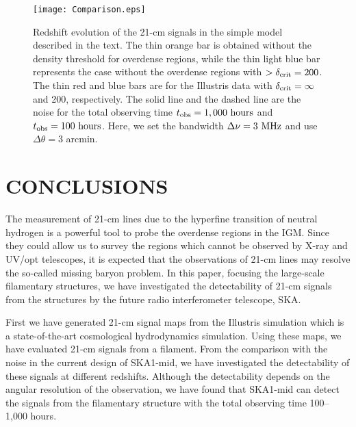 \documentclass[a4paper,fleqn,usenatbib,useAMS]{mnras}
\begin{document}
\begin{figure}
 \texttt{[image: Comparison.eps]}
 \caption{
Redshift evolution of the 21-cm signals in the simple model described in the text. 
The thin orange bar is obtained without the
 density threshold for overdense regions, while the thin light blue
 bar represents the case without the overdense regions with
 $>\delta_{\rm crit} =200$. The thin red and blue bars are for the
 Illustris data with $\delta_{\rm crit} = \infty$ and 200, respectively.  
 The solid line and the
 dashed line are the noise for the total observing time $t_{\rm{obs}}
 = 1,000~\rm{hours}$ and $t_{\rm{obs}} = 100~\rm{hours}$.
 Here, we set the bandwidth $\Delta \nu = 3~\rm{MHz}$ and use $\Delta \theta = 3$ arcmin.
 }\label{fig:compare}
\end{figure}

\section{CONCLUSIONS}\label{CONCLUSIONS} 

The measurement of 21-cm lines due to the hyperfine transition of
neutral hydrogen is a powerful tool to probe the overdense regions in
the IGM. Since they could allow us to survey the regions
which cannot be observed by X-ray and UV/opt telescopes, it is
expected that the observations of 21-cm lines may resolve the so-called
missing baryon problem.
In this paper, focusing the large-scale filamentary structures, we have investigated the detectability of 21-cm signals from the structures by the future radio interferometer telescope, SKA.

First we have generated 21-cm signal maps from the Illustris simulation which is a state-of-the-art cosmological hydrodynamics simulation. 
Using these maps, we have evaluated 21-cm signals from
a filament. 
From the comparison with the noise in the
current design of SKA1-mid, we have investigated the detectability of
these signals at different redshifts. 
Although the detectability depends on the angular resolution of the observation,
we have found that SKA1-mid can detect the signals from the filamentary structure with the total observing time 100--1,000 hours.
\end{document}
